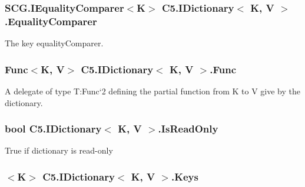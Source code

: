 \subsubsection[{Equality\+Comparer}]{\setlength{\rightskip}{0pt plus 5cm}S\+C\+G.\+I\+Equality\+Comparer$<$K$>$ {\bf C5.\+I\+Dictionary}$<$ K, V $>$.Equality\+Comparer\hspace{0.3cm}{\ttfamily [get]}}\label{interface_c5_1_1_i_dictionary_a0bf7369acbd3334ece5ce696517678d3}


The key equality\+Comparer. 

\hypertarget{interface_c5_1_1_i_dictionary_a253959f9511770e1afe1082d871a4489}{}
\subsubsection[{Func}]{\setlength{\rightskip}{0pt plus 5cm}Func$<$K, V$>$ {\bf C5.\+I\+Dictionary}$<$ K, V $>$.Func\hspace{0.3cm}{\ttfamily [get]}}\label{interface_c5_1_1_i_dictionary_a253959f9511770e1afe1082d871a4489}




A delegate of type T\+:\+Func`2 defining the partial function from K to V give by the dictionary.\hypertarget{interface_c5_1_1_i_dictionary_ace8a1dded19cb8d2a60c4c7274ebb321}{}
\subsubsection[{Is\+Read\+Only}]{\setlength{\rightskip}{0pt plus 5cm}bool {\bf C5.\+I\+Dictionary}$<$ K, V $>$.Is\+Read\+Only\hspace{0.3cm}{\ttfamily [get]}}\label{interface_c5_1_1_i_dictionary_ace8a1dded19cb8d2a60c4c7274ebb321}




True if dictionary is read-\/only\hypertarget{interface_c5_1_1_i_dictionary_adc8e64e7f441dbf36723fde4734c19d1}{}
\subsubsection[{Keys}]{$<$K$>$ {\bf C5.\+I\+Dictionary}$<$ K, V $>$.Keys\hspace{0.3cm}{\ttfamily [get]}}\label{interface_c5_1_1_i_dictionary_adc8e64e7f441dbf36723fde4734c19d1}




